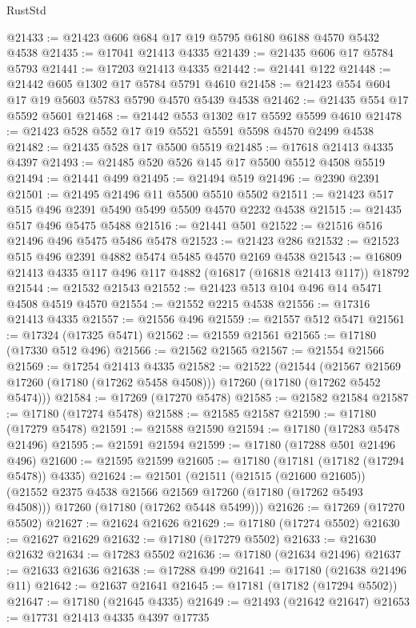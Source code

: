 \begin{lexlean}{RustStd}
\begin{coremodule}
@21433 := @21423 @606 @684 @17 @19 @5795 @6180 @6188 @4570 @5432 @4538
@21435 := @17041 @21413 @4335
@21439 := @21435 @606 @17 @5784 @5793
@21441 := @17203 @21413 @4335
@21442 := @21441 @122
@21448 := @21442 @605 @1302 @17 @5784 @5791 @4610
@21458 := @21423 @554 @604 @17 @19 @5603 @5783 @5790 @4570 @5439 @4538
@21462 := @21435 @554 @17 @5592 @5601
@21468 := @21442 @553 @1302 @17 @5592 @5599 @4610
@21478 := @21423 @528 @552 @17 @19 @5521 @5591 @5598 @4570 @2499 @4538
@21482 := @21435 @528 @17 @5500 @5519
@21485 := @17618 @21413 @4335 @4397
@21493 := @21485 @520 @526 @145 @17 @5500 @5512 @4508 @5519
@21494 := @21441 @499
@21495 := @21494 @519
@21496 := @2390 @2391
@21501 := @21495 @21496 @11 @5500 @5510 @5502
@21511 := @21423 @517 @515 @496 @2391 @5490 @5499 @5509 @4570 @2232 @4538
@21515 := @21435 @517 @496 @5475 @5488
@21516 := @21441 @501
@21522 := @21516 @516 @21496 @496 @5475 @5486 @5478
@21523 := @21423 @286
@21532 := @21523 @515 @496 @2391 @4882 @5474 @5485 @4570 @2169 @4538
@21543 := @16809 @21413 @4335 @117 @496 @117 @4882 (@16817 (@16818 @21413 @117)) @18792
@21544 := @21532 @21543
@21552 := @21423 @513 @104 @496 @14 @5471 @4508 @4519 @4570
@21554 := @21552 @2215 @4538
@21556 := @17316 @21413 @4335
@21557 := @21556 @496
@21559 := @21557 @512 @5471
@21561 := @17324 (@17325 @5471)
@21562 := @21559 @21561
@21565 := @17180 (@17330 @512 @496)
@21566 := @21562 @21565
@21567 := @21554 @21566
@21569 := @17254 @21413 @4335
@21582 := @21522
    (@21544
      (@21567 @21569 @17260 (@17180 (@17262 @5458 @4508)))
      @17260
      (@17180 (@17262 @5452 @5474)))
@21584 := @17269 (@17270 @5478)
@21585 := @21582 @21584
@21587 := @17180 (@17274 @5478)
@21588 := @21585 @21587
@21590 := @17180 (@17279 @5478)
@21591 := @21588 @21590
@21594 := @17180 (@17283 @5478 @21496)
@21595 := @21591 @21594
@21599 := @17180 (@17288 @501 @21496 @496)
@21600 := @21595 @21599
@21605 := @17180 (@17181 (@17182 (@17294 @5478)) @4335)
@21624 := @21501
    (@21511
      (@21515 (@21600 @21605))
      (@21552 @2375 @4538 @21566 @21569 @17260 (@17180 (@17262 @5493 @4508)))
      @17260
      (@17180 (@17262 @5448 @5499)))
@21626 := @17269 (@17270 @5502)
@21627 := @21624 @21626
@21629 := @17180 (@17274 @5502)
@21630 := @21627 @21629
@21632 := @17180 (@17279 @5502)
@21633 := @21630 @21632
@21634 := @17283 @5502
@21636 := @17180 (@21634 @21496)
@21637 := @21633 @21636
@21638 := @17288 @499
@21641 := @17180 (@21638 @21496 @11)
@21642 := @21637 @21641
@21645 := @17181 (@17182 (@17294 @5502))
@21647 := @17180 (@21645 @4335)
@21649 := @21493 (@21642 @21647)
@21653 := @17731 @21413 @4335 @4397 @17735

\end{coremodule}
\end{lexlean}
